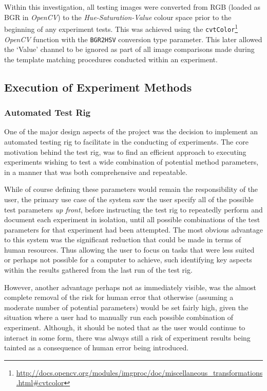 Within this investigation, all testing images were converted from RGB (loaded as BGR in \textit{OpenCV}) to the \textit{Hue-Saturation-Value} colour space prior to the beginning of any experiment tests. This was achieved using the \texttt{cvtColor}\footnote{\url{http://docs.opencv.org/modules/imgproc/doc/miscellaneous_transformations.html#cvtcolor}} \textit{OpenCV} function with the \texttt{BGR2HSV} conversion type parameter. This later allowed the `Value' channel to be ignored as part of all image comparisons made during the template matching procedures conducted within an experiment.

\subsection{Execution of Experiment Methods}

\subsubsection{Automated Test Rig}

One of the major design aspects of the project was the decision to implement an automated testing rig to facilitate in the conducting of experiments. The core motivation behind the test rig, was to find an efficient approach to executing experiments wishing to test a wide combination of potential method parameters, in a manner that was both comprehensive and repeatable. 

While of course defining these parameters would remain the responsibility of the user, the primary use case of the system saw the user specify all of the possible test parameters \textit{up front}, before instructing the test rig to repeatedly perform and document each experiment in isolation, until all possible combinations of the test parameters for that experiment had been attempted. The most obvious advantage to this system was the significant reduction that could be made in terms of human resources. Thus allowing the user to focus on tasks that were less suited or perhaps not possible for a computer to achieve, such identifying key aspects within the results gathered from the last run of the test rig. 

However, another advantage perhaps not as immediately visible, was the almost complete removal of the risk for human error that otherwise (assuming a moderate number of potential parameters) would be set fairly high, given the situation where a user had to manually run each possible combination of experiment. Although, it should be noted that as the user would continue to interact in some form, there was always still a risk of experiment results being tainted as a consequence of human error being introduced. 

